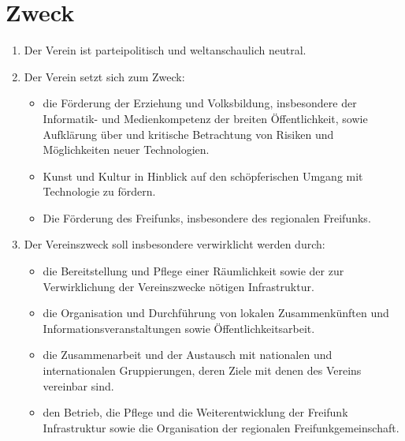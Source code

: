 \documentclass[10pt,conference,a4paper,nofonttune]{IEEEtran}
\begin{document}
\section{Zweck}
\begin{enumerate}
  \item Der Verein ist parteipolitisch und weltanschaulich neutral.

  \item Der Verein setzt sich zum Zweck:
    \begin{itemize}
      \item die Förderung der Erziehung und Volksbildung, insbesondere der
        Informatik- und Medienkompetenz der breiten Öffentlichkeit, sowie
        Aufklärung über und kritische Betrachtung von Risiken und Möglichkeiten
        neuer Technologien.

      \item Kunst und Kultur in Hinblick auf den schöpferischen Umgang mit
        Technologie zu fördern.
        
      \item Die Förderung des Freifunks, insbesondere des regionalen Freifunks.
    \end{itemize}

  \item Der Vereinszweck soll insbesondere verwirklicht werden durch:
    \begin{itemize}
      \item die Bereitstellung und Pflege einer Räumlichkeit sowie der zur
        Verwirklichung der Vereinszwecke nötigen Infrastruktur.

      \item die Organisation und Durchführung von lokalen Zusammenkünften und
        Informationsveranstaltungen sowie Öffentlichkeitsarbeit.

      \item die Zusammenarbeit und der Austausch mit nationalen und
        internationalen Gruppierungen, deren Ziele mit denen des Vereins
        vereinbar sind.
        
      \item den Betrieb, die Pflege und die Weiterentwicklung der Freifunk Infrastruktur sowie
        die Organisation der regionalen Freifunkgemeinschaft.
    \end{itemize}
\end{enumerate}
\end{document}
